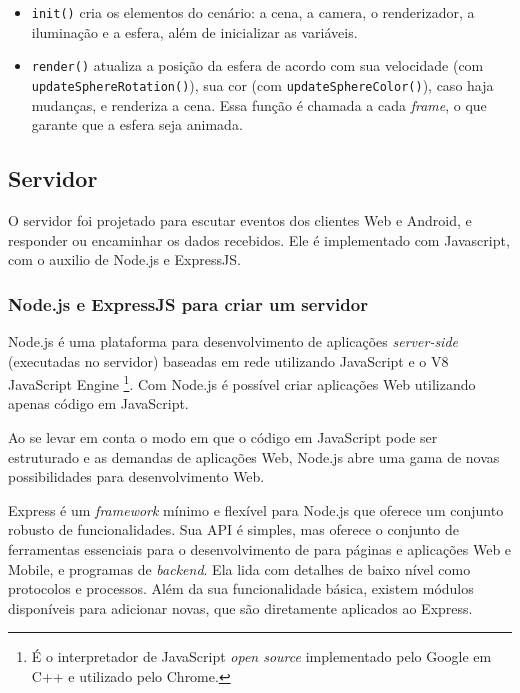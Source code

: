 \documentclass[a4paper,12pt]{article}
\newcommand{\code}[1]{\lstinline[mathescape=true, columns=fixed, basicstyle={\small\ttfamily}]{#1}}
\begin{document}
\begin{itemize}
  \item \code{init()} cria os elementos do cenário: a cena, a camera, o renderizador, a iluminação e a esfera, além de inicializar as variáveis.

  \item \code{render()} atualiza a posição da esfera de acordo com sua velocidade (com \code{updateSphereRotation()}), sua cor (com \code{updateSphereColor()}), caso haja mudanças, e renderiza a cena. Essa função é chamada a cada \emph{frame}, o que garante que a esfera seja animada.
\end{itemize}



\newpage
\subsection{Servidor}

O servidor foi projetado para escutar eventos dos clientes Web e Android, e responder ou encaminhar os dados recebidos. Ele é implementado com Javascript, com o auxilio de Node.js e ExpressJS.

\subsubsection{Node.js e ExpressJS para criar um servidor}

Node.js é uma plataforma para desenvolvimento de aplicações \emph{server-side} (executadas no servidor) baseadas em rede utilizando JavaScript e o V8 JavaScript Engine \footnote{É o interpretador de JavaScript \emph{open source} implementado pelo Google em C++ e utilizado pelo Chrome.}. Com Node.js é possível criar aplicações Web utilizando apenas código em JavaScript.

Ao se levar em conta o modo em que o código em JavaScript pode ser estruturado e as demandas de aplicações Web, Node.js abre uma gama de novas possibilidades para desenvolvimento Web.


Express é um \emph{framework} mínimo e flexível para Node.js que oferece um conjunto robusto de funcionalidades. Sua API é simples, mas oferece o conjunto de ferramentas essenciais para o desenvolvimento de para páginas e aplicações Web e Mobile, e programas de \emph{backend}. Ela lida com detalhes de baixo nível como protocolos e processos. Além da sua funcionalidade básica, existem módulos disponíveis para adicionar novas, que são diretamente aplicados ao Express.
\end{document}
